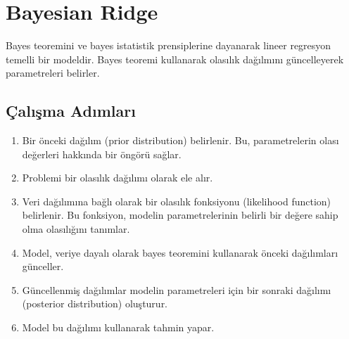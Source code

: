 \section{Bayesian Ridge}
Bayes teoremini ve bayes istatistik prensiplerine dayanarak lineer regresyon temelli bir modeldir. Bayes teoremi kullanarak olasılık dağılmını güncelleyerek parametreleri belirler.

\subsection{Çalışma Adımları}
\begin{enumerate}
    \item Bir önceki dağılım (prior distribution) belirlenir. Bu, parametrelerin olası değerleri hakkında bir öngörü sağlar.
    \item Problemi bir olasılık dağılımı olarak ele alır.
    \item Veri dağılımına bağlı olarak bir olasılık fonksiyonu (likelihood function) belirlenir. Bu fonksiyon, modelin parametrelerinin belirli bir değere sahip olma olasılığını tanımlar.
    \item Model, veriye dayalı olarak bayes teoremini kullanarak önceki dağılımları günceller.
    \item Güncellenmiş dağılımlar modelin parametreleri için bir sonraki dağılımı (posterior distribution) oluşturur.
    \item Model bu dağılımı kullanarak tahmin yapar.
\end{enumerate}

\begin{table}[ht]
\centering
{\scriptsize\renewcommand{\arraystretch}{0.4}
{}}
\end{table}

\newpage